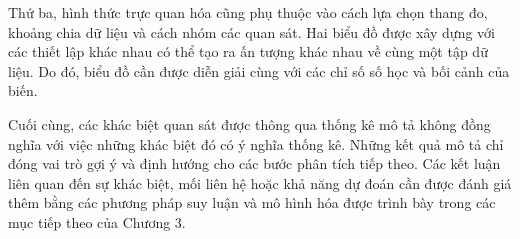 \documentclass[../main.tex]{subfiles}
\begin{document}
Thứ ba, hình thức trực quan hóa cũng phụ thuộc vào cách lựa chọn thang đo, khoảng chia dữ liệu và cách nhóm các quan sát. Hai biểu đồ được xây dựng với các thiết lập khác nhau có thể tạo ra ấn tượng khác nhau về cùng một tập dữ liệu. Do đó, biểu đồ cần được diễn giải cùng với các chỉ số số học và bối cảnh của biến.

Cuối cùng, các khác biệt quan sát được thông qua thống kê mô tả không đồng nghĩa với việc những khác biệt đó có ý nghĩa thống kê. Những kết quả mô tả chỉ đóng vai trò gợi ý và định hướng cho các bước phân tích tiếp theo. Các kết luận liên quan đến sự khác biệt, mối liên hệ hoặc khả năng dự đoán cần được đánh giá thêm bằng các phương pháp suy luận và mô hình hóa được trình bày trong các mục tiếp theo của Chương 3.
\end{document}
